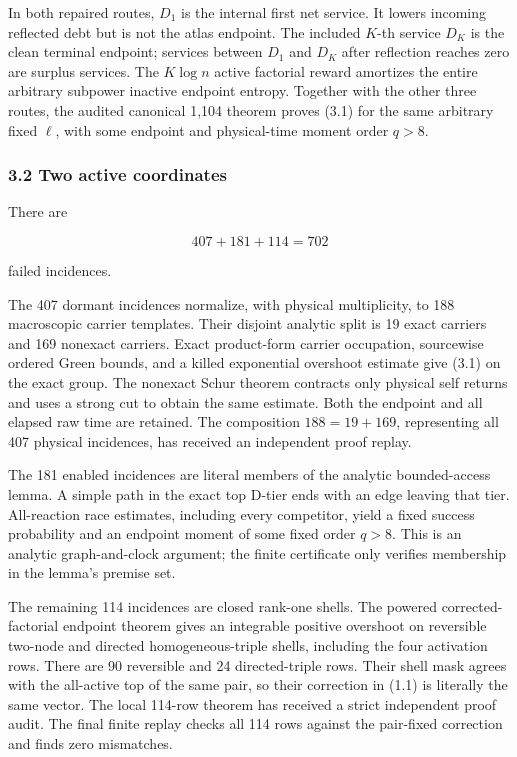 In both repaired routes, \(D_1\) is the internal first net service. It
lowers incoming reflected debt but is not the atlas endpoint. The
included \(K\)-th service \(D_K\) is the clean terminal endpoint;
services between \(D_1\) and \(D_K\) after reflection reaches zero are
surplus services. The \(K\log n\) active factorial reward amortizes the
entire arbitrary subpower inactive endpoint entropy. Together with the
other three routes, the audited canonical 1,104 theorem proves (3.1) for
the same arbitrary fixed \(\ell\), with some endpoint and physical-time
moment order \(q>8\).

\subsubsection{3.2 Two active coordinates}

There are

\[
 407+181+114=702                                      \tag{3.3}
\]

failed incidences.

The 407 dormant incidences normalize, with physical multiplicity, to 188
macroscopic carrier templates. Their disjoint analytic split is 19 exact
carriers and 169 nonexact carriers. Exact product-form carrier
occupation, sourcewise ordered Green bounds, and a killed exponential
overshoot estimate give (3.1) on the exact group. The nonexact Schur
theorem contracts only physical self returns and uses a strong cut to
obtain the same estimate. Both the endpoint and all elapsed raw time are
retained. The composition \(188=19+169\), representing all 407 physical
incidences, has received an independent proof replay.

The 181 enabled incidences are literal members of the analytic
bounded-access lemma. A simple path in the exact top D-tier ends with an
edge leaving that tier. All-reaction race estimates, including every
competitor, yield a fixed success probability and an endpoint moment of
some fixed order \(q>8\). This is an analytic graph-and-clock argument;
the finite certificate only verifies membership in the lemma's premise
set.

The remaining 114 incidences are closed rank-one shells. The powered
corrected-factorial endpoint theorem gives an integrable positive
overshoot on reversible two-node and directed homogeneous-triple shells,
including the four activation rows. There are 90 reversible and 24
directed-triple rows. Their shell mask agrees with the all-active top of
the same pair, so their correction in (1.1) is literally the same
vector. The local 114-row theorem has received a strict independent
proof audit. The final finite replay checks all 114 rows against the
pair-fixed correction and finds zero mismatches.

